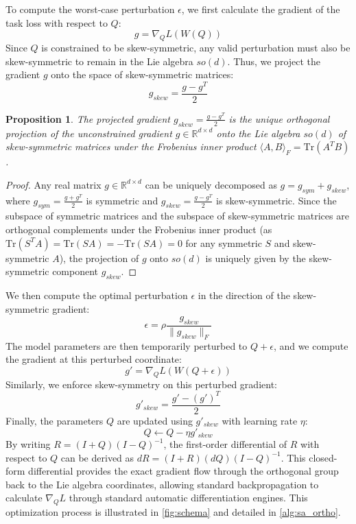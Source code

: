 \documentclass{article}
\theoremstyle{plain}
\newtheorem{proposition}[theorem]{Proposition}
\theoremstyle{definition}
\theoremstyle{remark}
\begin{document}
To compute the worst-case perturbation $\epsilon$, we first calculate the gradient of the task loss with respect to $Q$:
\begin{equation}
  g = \nabla_Q L(W(Q))
\end{equation}
Since $Q$ is constrained to be skew-symmetric, any valid perturbation must also be skew-symmetric to remain in the Lie algebra $so(d)$. Thus, we project the gradient $g$ onto the space of skew-symmetric matrices:
\begin{equation}
  g_{skew} = \frac{g - g^T}{2}
\end{equation}

\begin{proposition}
The projected gradient $g_{skew} = \frac{g - g^T}{2}$ is the unique orthogonal projection of the unconstrained gradient $g \in \mathbb{R}^{d \times d}$ onto the Lie algebra $so(d)$ of skew-symmetric matrices under the Frobenius inner product $\langle A, B \rangle_F = \text{Tr}(A^T B)$.
\end{proposition}
\begin{proof}
Any real matrix $g \in \mathbb{R}^{d \times d}$ can be uniquely decomposed as $g = g_{sym} + g_{skew}$, where $g_{sym} = \frac{g + g^T}{2}$ is symmetric and $g_{skew} = \frac{g - g^T}{2}$ is skew-symmetric. Since the subspace of symmetric matrices and the subspace of skew-symmetric matrices are orthogonal complements under the Frobenius inner product (as $\text{Tr}(S^T A) = \text{Tr}(S A) = -\text{Tr}(S A) = 0$ for any symmetric $S$ and skew-symmetric $A$), the projection of $g$ onto $so(d)$ is uniquely given by the skew-symmetric component $g_{skew}$.
\end{proof}

We then compute the optimal perturbation $\epsilon$ in the direction of the skew-symmetric gradient:
\begin{equation}
  \epsilon = \rho \frac{g_{skew}}{\|g_{skew}\|_F}
\end{equation}
The model parameters are then temporarily perturbed to $Q + \epsilon$, and we compute the gradient at this perturbed coordinate:
\begin{equation}
  g' = \nabla_Q L(W(Q + \epsilon))
\end{equation}
Similarly, we enforce skew-symmetry on this perturbed gradient:
\begin{equation}
  g'_{skew} = \frac{g' - (g')^T}{2}
\end{equation}
Finally, the parameters $Q$ are updated using $g'_{skew}$ with learning rate $\eta$:
\begin{equation}
  Q \leftarrow Q - \eta g'_{skew}
\end{equation}
By writing $R = (I+Q)(I-Q)^{-1}$, the first-order differential of $R$ with respect to $Q$ can be derived as $dR = (I+R)(dQ)(I-Q)^{-1}$. This closed-form differential provides the exact gradient flow through the orthogonal group back to the Lie algebra coordinates, allowing standard backpropagation to calculate $\nabla_Q L$ through standard automatic differentiation engines. This optimization process is illustrated in \cref{fig:schema} and detailed in \cref{alg:sa_ortho}.
\end{document}
